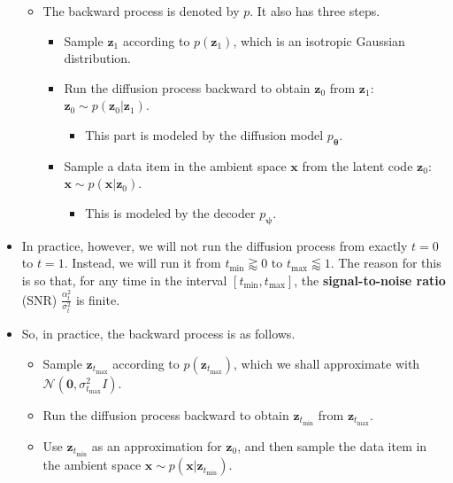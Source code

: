 \documentclass[10pt]{article}
\newcommand{\ve}[1]{\mathbf{#1}}
\newcommand{\ves}[1]{\boldsymbol{#1}}
\newcommand{\mcal}[1]{\mathcal{#1}}
\begin{document}
\begin{itemize}
\begin{itemize}
    \item The backward process is denoted by $p$. It also has three steps.
    \begin{itemize}
      \item Sample $\ve{z}_1$ according to $p(\ve{z}_1)$, which is an isotropic Gaussian distribution.
      \item Run the diffusion process backward to obtain $\ve{z}_0$ from $\ve{z}_1$: $\ve{z}_0 \sim p(\ve{z}_0|\ve{z}_1)$.
      \begin{itemize}
        \item This part is modeled by the diffusion model $p_{\ves{\theta}}$.
      \end{itemize}
      \item Sample a data item in the ambient space $\ve{x}$ from the latent code $\ve{z}_0$: $\ve{x} \sim p(\ve{x}|\ve{z}_0)$.
      \begin{itemize}
        \item This is modeled by the decoder $p_{\ves{\psi}}$.
      \end{itemize}
    \end{itemize}    
  \end{itemize}

  \item In practice, however, we will not run the diffusion process from exactly $t = 0$ to $t = 1$. Instead, we will run it from $t_{\min} \gtrapprox 0$ to $t_{\max} \lessapprox 1$. The reason for this is so that, for any time in the interval $[t_{\min}, t_{\max}]$, the {\bf signal-to-noise ratio} (SNR) $\frac{\alpha_t^2}{\sigma_t^2}$  is finite.
  
  \item So, in practice, the backward process is as follows.
  \begin{itemize}
    \item Sample $\ve{z}_{t_{\max}}$ according to $p(\ve{z}_{t_{\max}})$, which we shall approximate with $\mcal{N}(\ve{0}, \sigma_{t_{\max}}^2 I)$.
    \item Run the diffusion process backward to obtain $\ve{z}_{t_{\min}}$ from $\ve{z}_{t_{\max}}$.
    \item Use $\ve{z}_{t_{\min}}$ as an approximation for $\ve{z}_0$, and then sample the data item in the ambient space $\ve{x} \sim p(\ve{x}|\ve{z}_{t_{\min}})$.
  \end{itemize}


\end{itemize}
\end{document}
